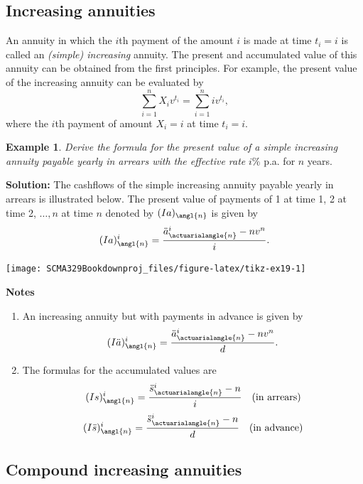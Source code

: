 \documentclass[
]{book}
\theoremstyle{definition}
\theoremstyle{definition}
\newtheorem{example}{Example}[chapter]
\theoremstyle{definition}
\theoremstyle{definition}
\theoremstyle{remark}
\begin{document}
\hypertarget{increasing-annuities}{%
\subsection{Increasing annuities}\label{increasing-annuities}}

An annuity in which the \(i\)th payment of the amount \(i\) is made at time
\(t_i = i\) is called an \emph{(simple) increasing} annuity. The present and
accumulated value of this annuity can be obtained from the first
principles. For example, the present value of the increasing annuity can
be evaluated by \[\sum_{i=1}^n X_i v^{t_i} = \sum_{i=1}^n i v^{t_i},\]
where the \(i\)th payment of amount \(X_i = i\) at time \(t_i = i\).

\begin{example}
\emph{Derive the formula for the present value of a simple increasing annuity
payable yearly in arrears with the effective rate} \(i\%\) p.a. for \(n\)
years.
\end{example}

\textbf{Solution:} The cashflows of the simple increasing annuity payable
yearly in arrears is illustrated below. The present value of payments of
1 at time 1, 2 at time 2, \(\ldots, n\) at time \(n\) denoted by
\((Ia)_\angl{n}\) is given by
\[(Ia)^{i}_\angl{n}   = \frac{\ddot{a}^{i}_{\actuarialangle{n}} - nv^n}{i}.\]

\begin{center}\texttt{[image: SCMA329Bookdownproj\_files/figure-latex/tikz-ex19-1]} \end{center}

\textbf{Notes}

\begin{enumerate}
\def\labelenumi{\arabic{enumi}.}
\item
  An increasing annuity but with payments in advance is given by
  \[(I\ddot{a})^{i}_\angl{n}   = \frac{\ddot{a}^{i}_{\actuarialangle{n}} - nv^n}{d}.\]
\item
  The formulas for the accumulated values are
  \[(Is)^{i}_\angl{n} = \frac{\ddot{s}^{i}_{\actuarialangle{n}} - n}{i} \quad\text{(in arrears)}\]
  \[(I\ddot{s})^{i}_\angl{n} = \frac{\ddot{s}^{i}_{\actuarialangle{n}} - n}{d} \quad\text{(in advance)}\]
\end{enumerate}

\hypertarget{compound-increasing-annuities}{%
\subsection{Compound increasing annuities}\label{compound-increasing-annuities}}
\end{document}
